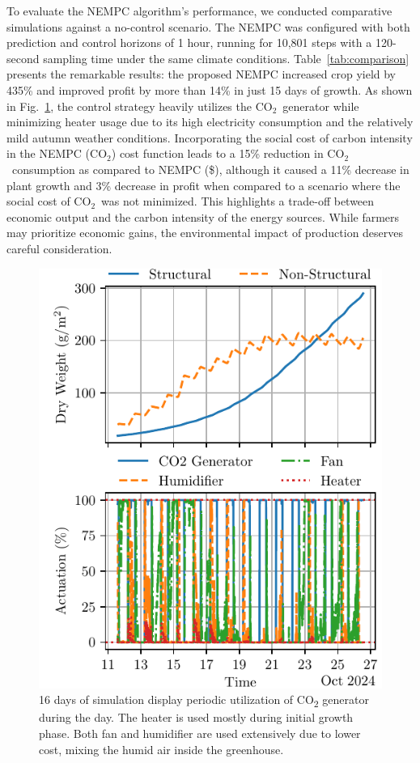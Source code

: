 \documentclass[conference]{IEEEtran}
\newcommand{\coo}{\ensuremath{\mathrm{CO_2}}}
\begin{document}
To evaluate the NEMPC algorithm's performance, we conducted comparative simulations against a no-control scenario. The NEMPC was configured with both prediction and control horizons of 1 hour, running for 10,801 steps with a 120-second sampling time under the same climate conditions. Table~\ref{tab:comparison} presents the remarkable results: the proposed NEMPC increased crop yield by 435\% and improved profit by more than 14\% in just 15 days of growth. As shown in Fig.~\ref{fig:control}, the control strategy heavily utilizes the \coo\ generator while minimizing heater usage due to its high electricity consumption and the relatively mild autumn weather conditions.
Incorporating the social cost of carbon intensity in the NEMPC (\coo) cost function leads to a 15\% reduction in \coo\ consumption as compared to NEMPC (\$), although it caused a 11\% decrease in plant growth and 3\% decrease in profit when compared to a scenario where the social cost of \coo\ was not minimized. This highlights a trade-off between economic output and the carbon intensity of the energy sources. While farmers may prioritize economic gains, the environmental impact of production deserves careful consideration.
\begin{figure}
    \centering
    \includegraphics[width=\linewidth]{figures/greenhouse_control-mpc_co2-N_30-steps_10801.pdf}
    \caption{16 days of simulation display periodic utilization of CO\textsubscript{2} generator during the day. The heater is used mostly during initial growth phase. Both fan and humidifier are used extensively due to lower cost, mixing the humid air inside the greenhouse.}\label{fig:control}
\end{figure}
\end{document}
